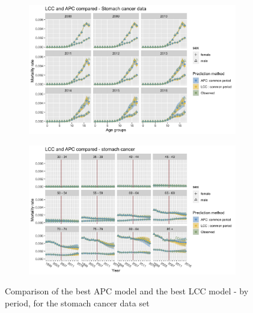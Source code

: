 \begin{figure}
    \centering
    \begin{subfigure}[b]{.45\linewidth}
        \includegraphics[width=\linewidth]{real-data/real-data-multivariate/Figures/multivariate-comparison-by-age-stomach.png}
    \end{subfigure}
    \begin{subfigure}[b]{.45\linewidth}
        \includegraphics[width=\linewidth]{real-data/real-data-multivariate/Figures/multivariate-comparison-by-period-stomach.png}
    \end{subfigure}
    \caption{Comparison of the best APC model and the best LCC model - by period, for the stomach cancer data set}
    \label{fig:mv-LCC-APC-stomach}
\end{figure}

\newpage
